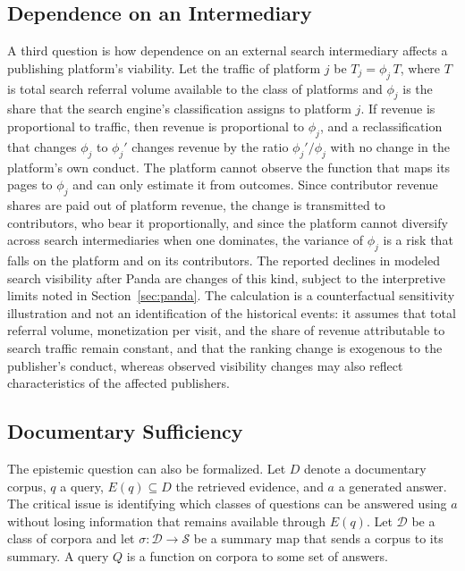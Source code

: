 \documentclass[11pt]{article}
\theoremstyle{remark}
\begin{document}
\subsection{Dependence on an Intermediary}

A third question is how dependence on an external search intermediary affects a publishing platform's viability. Let the traffic of platform $j$ be $T_j = \phi_j \, T$, where $T$ is total search referral volume available to the class of platforms and $\phi_j$ is the share that the search engine's classification assigns to platform $j$. If revenue is proportional to traffic, then revenue is proportional to $\phi_j$, and a reclassification that changes $\phi_j$ to $\phi_j'$ changes revenue by the ratio $\phi_j'/\phi_j$ with no change in the platform's own conduct. The platform cannot observe the function that maps its pages to $\phi_j$ and can only estimate it from outcomes. Since contributor revenue shares are paid out of platform revenue, the change is transmitted to contributors, who bear it proportionally, and since the platform cannot diversify across search intermediaries when one dominates, the variance of $\phi_j$ is a risk that falls on the platform and on its contributors. The reported declines in modeled search visibility after Panda are changes of this kind, subject to the interpretive limits noted in Section~\ref{sec:panda}. The calculation is a counterfactual sensitivity illustration and not an identification of the historical events: it assumes that total referral volume, monetization per visit, and the share of revenue attributable to search traffic remain constant, and that the ranking change is exogenous to the publisher's conduct, whereas observed visibility changes may also reflect characteristics of the affected publishers.

\subsection{Documentary Sufficiency}

The epistemic question can also be formalized. Let $D$ denote a documentary corpus, $q$ a query, $E(q) \subseteq D$ the retrieved evidence, and $a$ a generated answer. The critical issue is identifying which classes of questions can be answered using $a$ without losing information that remains available through $E(q)$. Let $\mathcal{D}$ be a class of corpora and let $\sigma : \mathcal{D} \to \mathcal{S}$ be a summary map that sends a corpus to its summary. A query $Q$ is a function on corpora to some set of answers.
\end{document}
